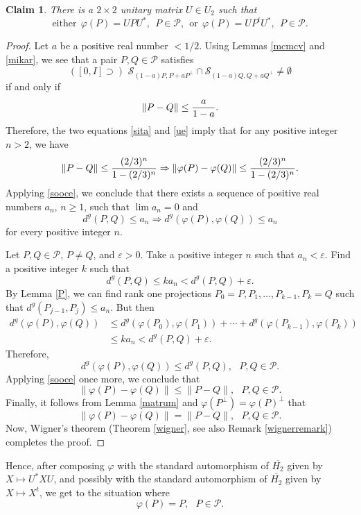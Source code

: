 \documentclass[10pt]{amsart}
\newtheorem{claim}[theorem]{Claim}
\theoremstyle{definition}
\theoremstyle{remark}
\numberwithin{subsection}{section}
\numberwithin{equation}{section}
\newcommand\oH{{\overline{H_2}}}
\begin{document}
\begin{claim}
There is a $2\times 2$ unitary matrix $U\in U_2$ such that 
\[
\text{either}\ \ \varphi (P) = UPU^\ast,\ \  P \in \mathcal{P},\ \ \text{or}\ \  \varphi (P) = UP^tU^\ast,\ \ P \in \mathcal{P}.
\]
\end{claim}
\begin{proof}
Let $a$ be a positive real number $< 1/2$. Using Lemmas \ref{mcmcv} and \ref{mikar}, we see that a pair $P,Q \in \mathcal{P}$ satisfies
\[
([0,I]\supset) \,\, \mathcal{S}_{(1-a)P, P + aP^\perp} \cap \mathcal{S}_{(1-a)Q, Q + aQ^\perp} \not= \emptyset
\]
if and only if
\[
\| P - Q \| \le { a \over 1-a } .
\]
Therefore, the two equations \eqref{sita} and \eqref{ue} imply that for any positive integer $n > 2$, we have
\[
\| P -Q \| \le { (2/3)^n \over 1 - (2/3)^n } \Rightarrow \| \varphi (P ) - \varphi (Q) \| \le { (2/3)^n \over 1 - (2/3)^n }.
\]
Applying \eqref{sooce}, we conclude that there exists a sequence of positive real numbers $a_n$, $n\geq 1$, such that $\lim a_n = 0$ and
\[
d^g (P,Q) \le a_n \Rightarrow d^g (\varphi (P) , \varphi (Q)) \le a_n
\]
for every positive integer $n$.



Let $P,Q \in \mathcal{P}$, $P \not= Q$, and $ \varepsilon >0 $. Take a positive integer $n$ such that $a_n <  \varepsilon$. Find a positive integer $k$ such that
\[
d^g (P,Q) \le k a_n < d^g (P,Q) + \varepsilon.
\]
By Lemma \ref{P}, we can find rank one projections $P_0 = P, P_1 , \ldots, P_{k-1}, P_k = Q$ such that $d^g (P_{j-1},P_j) \le a_n$. But then
\[
\begin{split}
d^g (\varphi (P),\varphi (Q)) 
&\le d^g (\varphi (P_0),\varphi (P_1)) + \cdots +  d^g (\varphi (P_{k-1}),\varphi (P_k)) \\
& \leq  k a_n < d^g (P,Q) + \varepsilon.
\end{split}
\]
Therefore,
\[
d^g (\varphi (P),\varphi (Q)) \le d^g (P,Q), \ \ \ P,Q \in \mathcal{P}.
\]
Applying \eqref{sooce} once more, we conclude that
\[
\| \varphi (P) - \varphi (Q) \| \le \| P - Q \|, \ \ \ P,Q \in \mathcal{P}.
\]
Finally, it follows from Lemma \ref{matrum} and $\varphi (P^\perp) = \varphi(P)^\perp$ that 
\[
\| \varphi (P) - \varphi (Q) \| = \| P - Q \|, \ \ \ P,Q \in \mathcal{P}.
\]
Now, Wigner's theorem (Theorem \ref{wigner}, see also Remark \ref{wignerremark}) completes the proof. 
\end{proof}

Hence, after composing $\varphi$ with the standard automorphism of $\oH$ given by $X \mapsto U^\ast X U$, 
and possibly with the standard automorphism of $\oH$ given by $X \mapsto X^t$, we get to the situation where
\[
\varphi (P) = P, \ \ \ P \in \mathcal{P}.
\]
\end{document}
